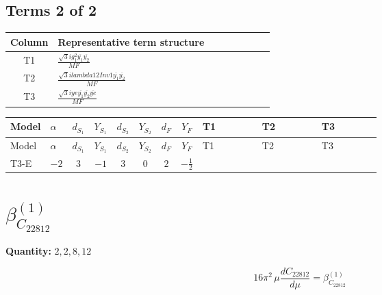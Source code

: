 \documentclass[8pt]{article}
\begin{document}
\begin{landscape}
\subsection*{Terms 2 of 2}
\begin{center}
\begin{tabular}{@{}c >{\raggedright\arraybackslash}p{0.82\linewidth}@{}}
\toprule
Column & Representative term structure \\
\midrule
T1 & \(\displaystyle \frac{\sqrt{3} i g_{1}^{2} \overline{y_{1}} \overline{y_{2}}}{MF}\) \\
\midrule
T2 & \(\displaystyle \frac{\sqrt{3} i lambda12Inv1 \overline{y_{1}} \overline{y_{2}}}{MF}\) \\
\midrule
T3 & \(\displaystyle \frac{\sqrt{3} i ye \overline{y_{1}} \overline{y_{2}} \overline{ye}}{MF}\) \\
\midrule
\bottomrule
\end{tabular}
\end{center}
\smallskip
\tiny
\begin{longtable}{@{}llcccccc >{\raggedright\arraybackslash}p{0.21\linewidth} >{\raggedright\arraybackslash}p{0.21\linewidth} >{\raggedright\arraybackslash}p{0.21\linewidth}@{}}
\toprule
Model & $\alpha$ & $d_{S_1}$ & $Y_{S_1}$ & $d_{S_2}$ & $Y_{S_2}$ & $d_F$ & $Y_F$ & T1 & T2 & T3 \\
\midrule
\endfirsthead
\toprule
Model & $\alpha$ & $d_{S_1}$ & $Y_{S_1}$ & $d_{S_2}$ & $Y_{S_2}$ & $d_F$ & $Y_F$ & T1 & T2 & T3 \\
\midrule
\endhead
T3-E & $-2$ & $3$ & $-1$ & $3$ & $0$ & $2$ & $-\frac{1}{2}$ & \scriptsize\adjustbox{max width=\linewidth}{$\begin{gathered} - \frac{\sqrt{3} i g_{1}^{2} \overline{y_{1}} \overline{y_{2}}}{8 MF}\end{gathered}$} & \scriptsize\adjustbox{max width=\linewidth}{$\begin{gathered} \frac{\sqrt{3} i lambda12Inv1 \overline{y_{1}} \overline{y_{2}}}{6 MF}\end{gathered}$} & \scriptsize\adjustbox{max width=\linewidth}{$\begin{gathered} \frac{\sqrt{3} i ye \overline{y_{1}} \overline{y_{2}} \overline{ye}}{12 MF}\end{gathered}$} \\
\midrule
\bottomrule
\end{longtable}
\clearpage
\section*{$\beta_{C_{22812}}^{(1)}$}
\noindent\textbf{Quantity: }$\mathrm{2,2,8,12}$\par\smallskip
\[16\pi^2\,\mu\frac{d C_{22812}}{d\mu}=\beta_{C_{22812}}^{(1)}\]

\end{landscape}
\end{document}
